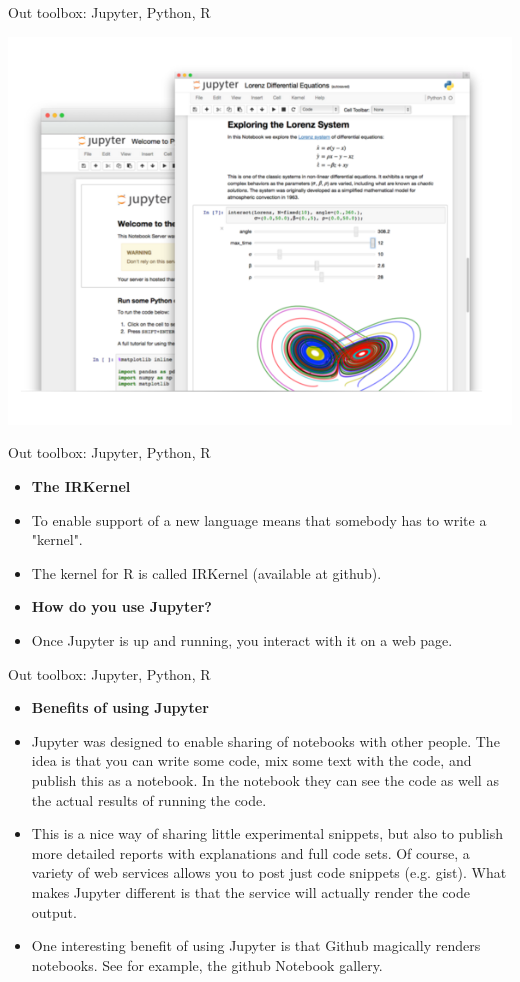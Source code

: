 \documentclass[11pt]{beamer}
\begin{document}
\begin{frame}{Out toolbox: Jupyter, Python, R}
\begin{center}
\includegraphics[scale=.5]{img/jupyter_2.PNG} 
\end{center}
\end{frame}
\begin{frame}{Out toolbox: Jupyter, Python, R}
\begin{itemize}
\item \textbf{The IRKernel}
\item To enable support of a new language means that somebody has to write a "kernel". 
\item The kernel for R is called IRKernel (available at github).
\item \textbf{How do you use Jupyter?}
\item  Once Jupyter is up and running, you interact with it on a web page.
\end{itemize}
\end{frame}
\begin{frame}{Out toolbox: Jupyter, Python, R}
\begin{itemize}
\item \textbf{Benefits of using Jupyter}
\item Jupyter was designed to enable sharing of notebooks with other people. The idea is that you can write some code, mix some text with the code, and publish this as a notebook.  In the notebook they can see the code as well as the actual results of running the code.
\item This is a nice way of sharing little experimental snippets, but also to publish more detailed reports with explanations and full code sets.  Of course, a variety of web services allows you to post just code snippets (e.g. gist). What makes Jupyter different is that the service will actually render the code output.
\item One interesting benefit of using Jupyter is that Github magically renders notebooks. See for example, the github Notebook gallery.
\end{itemize}
\end{frame}
\end{document}
